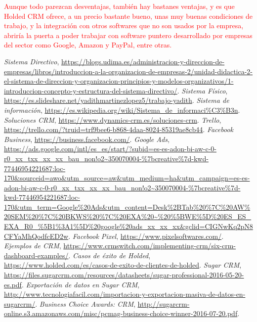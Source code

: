 \documentclass{article}
\begin{document}
\textcolor{Red}{Aunque todo parezcan desventajas, también hay bastanes ventajas, y es que Holded CRM ofrece, a un precio bastante bueno, unas muy buenas condiciones de trabajo, y la integración con otros softwares que no son usados por la empresa, abriría la puerta a poder trabajar con software puntero desarrollado por empresas del sector como Google, Amazon y PayPal, entre otras.}

\begin{thebibliography}{9}

 \textit{Sistema Directivo}, \url{https://blogs.udima.es/administracion-y-direccion-de-empresas/libros/introduccion-a-la-organizacion-de-empresas-2/unidad-didactica-2-el-sistema-de-direccion-y-organizacion-principios-y-modelos-organizativos/1-introduccion-concepto-y-estructura-del-sistema-directivo/}.
 \textit{Sistema Físico}, \url{https://es.slideshare.net/yadithmartinezlopez5/trabajo-yadith}.
 \textit{Sistema de información}, \url{https://es.wikipedia.org/wiki/Sistema_de_informaci\%C3\%B3n}.
 \textit{Soluciones CRM}, \url{https://www.dynamics-crm.es/soluciones-crm}.
 \textit{Trello}, \url{https://trello.com/?truid=trf9bee6-b868-4daa-8024-85319ae8cb44}.
 \textit{Facebook Business}, \url{https://business.facebook.com/}.
 \textit{Google Ads}, \url{https://ads.google.com/intl/es_es/start/?subid=es-es-adon-bi-aw-c-0-r0_xx_txx_xx_xx_bau_non!o2~350070004-\%7bcreative\%7d-kwd-77446954221687:loc-170&sourceid=awo&utm_source=aw&utm_medium=ha&utm_campaign=es-es-adon-bi-aw-c-0-r0_xx_txx_xx_xx_bau_non!o2~350070004-\%7bcreative\%7d-kwd-77446954221687:loc-170&utm_term=Google\%20Ads&utm_content=Desk\%2BTab\%20\%7C\%20AW\%20SEM\%20\%7C\%20BKWS\%20\%7C\%20EXA\%20~\%20\%5BWE\%5D\%20ES_ES_EXA_R0_\%5B1\%3A1\%5D\%20google\%20ads_xx_xx_xx&gclid=CIGNwKq2pN8CFYaMhQodfcED2w}.
 \textit{Facebook Pixel}, \url{https://www.pixelsoftwares.com/}.
 \textit{Ejemplos de CRM}, \url{https://www.crmswitch.com/implementing-crm/six-crm-dashboard-examples/}.
 \textit{Casos de éxito de Holded}, \url{https://www.holded.com/es/casos-de-exito-de-clientes-de-holded}.
 \textit{Sugar CRM}, \url{https://files.sugarcrm.com/resources/datasheets/sugar-professional-2016-05-20-es.pdf}.
 \textit{Exportación de datos en Sugar CRM}, \url{http://www.tecnologiafacil.com/importacion-y-exportacion-masiva-de-datos-en-sugarcrm/}.
 \textit{Business Choice Awards: CRM}, \url{http://sugarcrm-online.s3.amazonaws.com/misc/pcmag-business-choice-winner-2016-07-20.pdf}.

\end{thebibliography}
\end{document}
